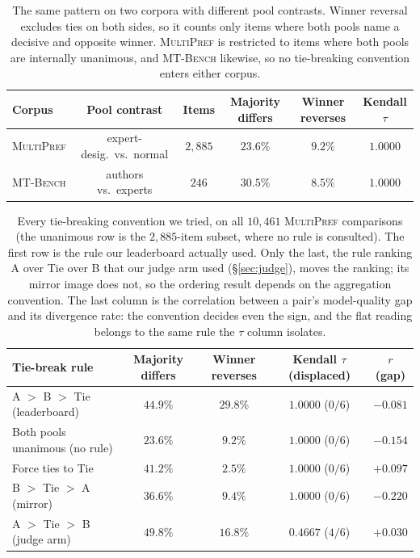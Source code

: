 \documentclass{article}
\begin{document}
\begin{table}[t]
\centering
\small
\caption{The same pattern on two corpora with different pool contrasts. Winner
reversal excludes ties on both sides, so it counts only items where both pools
name a decisive and opposite winner. \textsc{MultiPref} is restricted to items where both pools are
internally unanimous, and \textsc{MT-Bench} likewise, so no tie-breaking convention
enters either corpus.}
\label{tab:main}
\begin{tabular}{lccccc}
\toprule
Corpus & Pool contrast & Items & Majority differs & Winner reverses & Kendall $\tau$ \\
\midrule
\textsc{MultiPref} & expert-desig.\ vs.\ normal & $2{,}885$  & $23.6\%$ & $9.2\%$  & $1.0000$ \\
\textsc{MT-Bench}  & authors vs.\ experts & $246$      & $30.5\%$ & $8.5\%$  & $1.0000$ \\
\bottomrule
\end{tabular}
\end{table}

\begin{table}[t]
\centering
\small
\caption{Every tie-breaking convention we tried, on all $10{,}461$ \textsc{MultiPref}
comparisons (the unanimous row is the $2{,}885$-item subset, where no rule is consulted).
The first row is the rule our leaderboard actually used. Only the last, the rule ranking
A over Tie over B that our judge arm used (\S\ref{sec:judge}), moves the ranking; its mirror image does not, so the
ordering result depends on the aggregation convention. The last column is the correlation
between a pair's model-quality gap and its divergence rate: the convention decides even
the sign, and the flat reading belongs to the same rule the $\tau$ column isolates.}
\label{tab:tiebreak}
\begin{tabular}{lcccc}
\toprule
Tie-break rule & Majority differs & Winner reverses & Kendall $\tau$ (displaced) & $r$(gap) \\
\midrule
A $>$ B $>$ Tie (leaderboard)   & $44.9\%$ & $29.8\%$ & $1.0000$ ($0/6$) & $-0.081$ \\
Both pools unanimous (no rule)  & $23.6\%$ & $9.2\%$  & $1.0000$ ($0/6$) & $-0.154$ \\
Force ties to Tie               & $41.2\%$ & $2.5\%$  & $1.0000$ ($0/6$) & $+0.097$ \\
B $>$ Tie $>$ A (mirror)        & $36.6\%$ & $9.4\%$  & $1.0000$ ($0/6$) & $-0.220$ \\
A $>$ Tie $>$ B (judge arm)     & $49.8\%$ & $16.8\%$ & $0.4667$ ($4/6$) & $+0.030$ \\
\bottomrule
\end{tabular}
\end{table}
\end{document}
